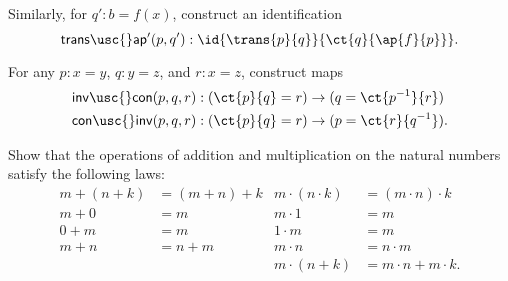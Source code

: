 \begin{exercises}
Similarly, for $q':b=f(x)$, construct an identification
\begin{equation*}
\mathsf{trans\usc{}ap'}(p,q'):\id{\trans{p}{q}}{\ct{q}{\ap{f}{p}}}.
\end{equation*}
\item \label{ex:inv_con}For any $p:x=y$, $q:y=z$, and $r:x=z$, construct maps
\begin{align*}
\mathsf{inv\usc{}con}(p,q,r) & : (\ct{p}{q}=r)\to (q=\ct{p^{-1}}{r}) \\
\mathsf{con\usc{}inv}(p,q,r) & : (\ct{p}{q}=r)\to (p=\ct{r}{q^{-1}}).
\end{align*}
\item Show that the operations of addition and multiplication on the natural numbers satisfy the following laws:
\begin{align*}
m+(n+k) & =(m+n)+k & m\cdot (n\cdot k) & = (m\cdot n)\cdot k \\
m+0 & = m & m\cdot 1 & = m \\
0+m & = m & 1\cdot m & = m \\
m+n & = n+m & m\cdot n & = n\cdot m\\
& & m\cdot (n+k) & = m\cdot n + m\cdot k.
\end{align*}
\end{exercises}
